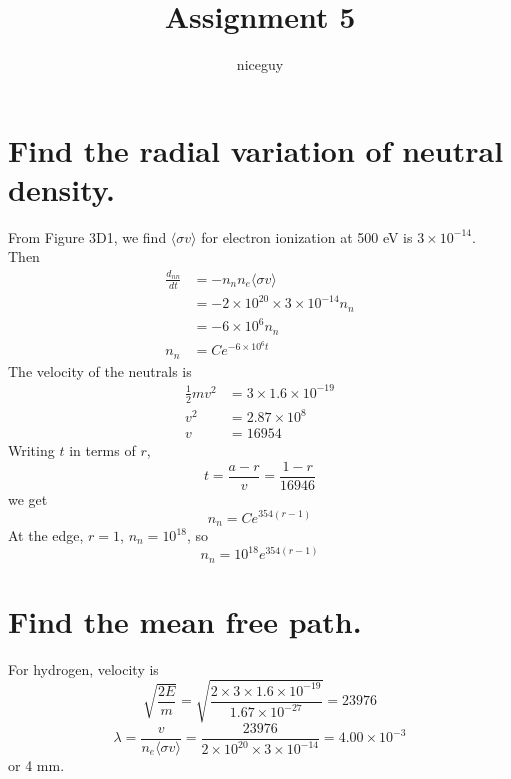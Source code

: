 \documentclass[answers]{exam}
\title{Assignment 5}
\author{niceguy}
\begin{document}
\maketitle

\begin{questions}


\begin{parts}

    
\part{Find the radial variation of neutral density.}

\begin{solution}
    From Figure 3D1, we find $\langle \sigma v\rangle$ for electron ionization at 500 eV is $3 \times 10^{-14}$. Then
    \begin{align*}
        \frac{d_{nn}}{dt} &= -n_nn_e\langle\sigma v\rangle \\
                          &= -2 \times 10^{20} \times 3 \times 10^{-14} n_n \\
                          &= -6 \times 10^6 n_n \\
        n_n &= Ce^{-6\times10^6t}
    \end{align*}
    The velocity of the neutrals is
    \begin{align*}
        \frac{1}{2}mv^2 &= 3 \times 1.6 \times 10^{-19} \\
        v^2 &= 2.87 \times 10^8 \\
        v &= 16954
    \end{align*}
    Writing $t$ in terms of $r$,
    $$t = \frac{a-r}{v} = \frac{1-r}{16946}$$
    we get
    $$n_n = Ce^{354(r-1)}$$
    At the edge, $r=1$, $n_n = 10^{18}$, so
    $$n_n = 10^{18}e^{354(r-1)}$$
\end{solution}

\part{Find the mean free path.}


\begin{solution}
    For hydrogen, velocity is
    $$\sqrt{\frac{2E}{m}} = \sqrt{\frac{2 \times 3 \times 1.6 \times 10^{-19}}{1.67 \times 10^{-27}}} = 23976$$
    $$\lambda = \frac{v}{n_e\langle \sigma v\rangle} = \frac{23976}{2 \times 10^{20} \times 3 \times 10^{-14}} = 4.00 \times 10^{-3}$$
    or 4 mm.
\end{solution}


\end{parts}
\end{questions}
\end{document}
